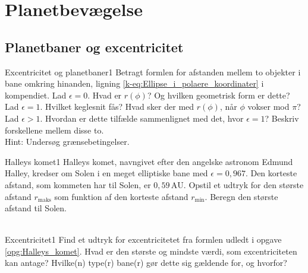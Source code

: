 \chapter{Planetbevægelse}
%
%
\section*{Planetbaner og excentricitet}
%
%
\begin{opgave}{Excentricitet og planetbaner}{1}
Betragt formlen for afstanden mellem to objekter i bane omkring hinanden, ligning \eqref{k-eq:Ellipse_i_polaere_koordinater} i kompendiet.
\opg Lad $\epsilon = 0$. Hvad er $r(\phi)$? Og hvilken geometrisk form er dette?
\opg Lad $\epsilon = 1$. Hvilket keglesnit fås? Hvad sker der med $r(\phi)$, når $\phi$ vokser mod $\pi$?
\opg Lad $\epsilon > 1$. Hvordan er dette tilfælde sammenlignet med det, hvor $\epsilon = 1$? Beskriv forskellene mellem disse to.\\
Hint: Undersøg grænsebetingelser.
\end{opgave}
%
%
\begin{opgave}{Halleys komet}{1} \label{opg:Halleys_komet}
Halleys komet, navngivet efter den angelske astronom Edmund Halley, kredser om Solen i en meget elliptiske bane med $\epsilon = 0,967$. Den korteste afstand, som kommeten har til Solen, er $0,59 \, \text{AU}$.
%
\opg Opstil et udtryk for den største afstand $r_{\mathrm{maks}}$ som funktion af den korteste afstand $r_{\mathrm{min}}$.
%
\opg Beregn den største afstand til Solen.\\ \\
\end{opgave}
%
%
\begin{opgave}{Excentricitet}{1}
\opg Find et udtryk for excentricitetet fra formlen udledt i opgave \ref{opg:Halleys_komet}.
%
\opg Hvad er den største og mindste værdi, som excentriciteten kan antage? Hvilke(n) type(r) bane(r) gør dette sig gældende for, og hvorfor?
\end{opgave}
%
%
%
